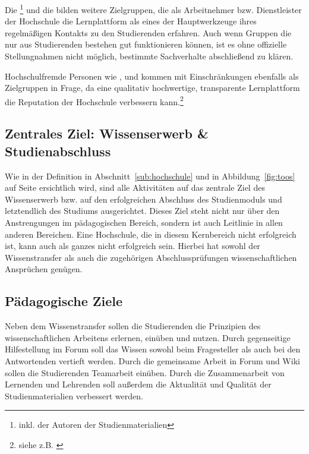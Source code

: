 Die \footnote{inkl. der Autoren der Studienmaterialien} und die  bilden weitere Zielgruppen, die als Arbeitnehmer bzw. Dienstleister der Hochschule die Lernplattform als eines der Hauptwerkzeuge ihres regelmäßigen Kontakts zu den Studierenden erfahren. Auch wenn Gruppen die nur aus Studierenden bestehen gut funktionieren können, ist es ohne offizielle Stellungnahmen nicht möglich, bestimmte Sachverhalte abschließend zu klären.

Hochschulfremde Personen wie ,  und  kommen mit Einschränkungen ebenfalls als Zielgruppen in Frage, da eine qualitativ hochwertige, transparente Lernplattform die Reputation der Hochschule verbessern kann.\footnote{siehe z.B. \cite{cs50}} 

\subsection{Zentrales Ziel: Wissenserwerb \& Studienabschluss} %
\label{sub:zentrales_ziel_wissenserwerb_studienabschluss}
Wie in der Definition in Abschnitt~\ref{sub:hochschule} und in Abbildung~\ref{fig:toos} auf Seite \pageref{fig:toos} ersichtlich wird, sind alle Aktivitäten auf das zentrale Ziel des Wissenserwerb bzw. auf den erfolgreichen Abschluss des Studienmoduls und letztendlich des Studiums ausgerichtet. Dieses Ziel steht nicht nur über den Anstrengungen im pädagogischen Bereich, sondern ist auch Leitlinie in allen anderen Bereichen. Eine Hochschule, die in diesem Kernbereich nicht erfolgreich ist, kann auch als ganzes nicht erfolgreich sein. Hierbei hat sowohl der Wissenstransfer als auch die zugehörigen Abschlussprüfungen wissenschaftlichen Ansprüchen genügen.

\subsection{Pädagogische Ziele} %
\label{sub:padagogische_ziele}
Neben dem Wissenstransfer sollen die Studierenden die Prinzipien des wissenschaftlichen Arbeitens erlernen, einüben und nutzen. Durch gegenseitige Hilfestellung im Forum soll das Wissen sowohl beim Fragesteller als auch bei den Antwortenden vertieft werden. Durch die gemeinsame Arbeit in Forum und Wiki sollen die Studierenden Teamarbeit einüben. Durch die Zusammenarbeit von Lernenden und Lehrenden soll außerdem die Aktualität und Qualität der Studienmaterialien verbessert werden.

